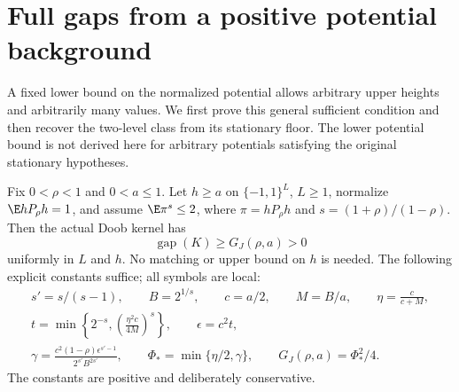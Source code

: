 \section{Full gaps from a positive potential background}\label{backgroundgap}\label{twolevelgap}
A fixed lower bound on the normalized potential allows arbitrary upper
heights and arbitrarily many values. We first prove this general sufficient
condition and then recover the two-level class from its stationary floor.
The lower potential bound is not derived here for arbitrary potentials
satisfying the original stationary hypotheses.

\begin{theorem}\label{backgroundfullgap}
Fix $0<\rho<1$ and $0<a\leq1$. Let $h\geq a$ on $\{-1,1\}^L$, $L\geq1$,
normalize $\E hP_\rho h=1$, and assume $\E\pi^s\leq2$, where
$\pi=hP_\rho h$ and $s=(1+\rho)/(1-\rho)$. Then the actual Doob kernel has
\[
 \operatorname{gap}(K)\geq G_J(\rho,a)>0
\]
uniformly in $L$ and $h$. No matching or upper bound on $h$ is needed.
The following explicit constants suffice; all symbols are local:
\begin{gather*}
 s'=s/(s-1),\qquad B=2^{1/s},\qquad c=a/2,\qquad M=B/a,
 \qquad\eta=\frac{c}{c+M},\\
 t=\min\left\{2^{-s},\left(\frac{\eta^2c}{4M}\right)^s\right\},
 \qquad\epsilon=c^2t,\\
 \gamma=\frac{c^2(1-\rho)\epsilon^{s'-1}}{2^{s'}B^{2s'}},
 \qquad\Phi_* =\min\{\eta/2,\gamma\},
 \qquad G_J(\rho,a)=\Phi_*^2/4.
\end{gather*}
The constants are positive and deliberately conservative.
\end{theorem}
